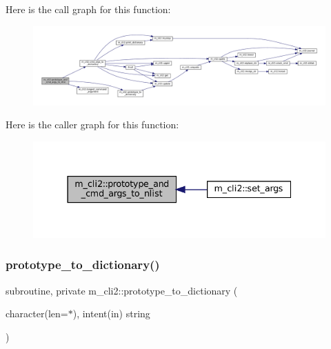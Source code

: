 Here is the call graph for this function\+:
\nopagebreak
\begin{figure}[H]
\begin{center}
\leavevmode
\includegraphics[width=350pt]{namespacem__cli2_a06f8bb6dd63fd7ac2a91b46ee89baaa9_cgraph}
\end{center}
\end{figure}
Here is the caller graph for this function\+:
\nopagebreak
\begin{figure}[H]
\begin{center}
\leavevmode
\includegraphics[width=337pt]{namespacem__cli2_a06f8bb6dd63fd7ac2a91b46ee89baaa9_icgraph}
\end{center}
\end{figure}
\mbox{\label{namespacem__cli2_a14896d00e509cbc32f4df993a8d6f75b}} 
\subsubsection{\texorpdfstring{prototype\+\_\+to\+\_\+dictionary()}{prototype\_to\_dictionary()}}
{\footnotesize\ttfamily subroutine, private m\+\_\+cli2\+::prototype\+\_\+to\+\_\+dictionary (\begin{DoxyParamCaption}\item[{character(len=$\ast$), intent(in)}]{string }\end{DoxyParamCaption})\hspace{0.3cm}{\ttfamily [private]}}



